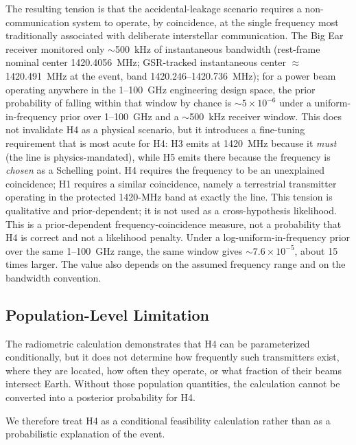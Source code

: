 \documentclass[twocolumn]{aastex701}
\begin{document}
The resulting tension is that the accidental-leakage scenario requires a non-communication system to operate, by coincidence, at the single frequency most traditionally associated with deliberate interstellar communication. The Big Ear receiver monitored only $\sim$500~kHz of instantaneous bandwidth (rest-frame nominal center 1420.4056~MHz; GSR-tracked instantaneous center $\approx$1420.491~MHz at the event, band 1420.246--1420.736~MHz); for a power beam operating anywhere in the 1--100~GHz engineering design space, the prior probability of falling within that window by chance is $\sim5\times10^{-6}$ under a uniform-in-frequency prior over 1--100~GHz and a $\sim$500~kHz receiver window. This does not invalidate H4 as a physical scenario, but it introduces a fine-tuning requirement that is most acute for H4: H3 emits at 1420~MHz because it \emph{must} (the line is physics-mandated), while H5 emits there because the frequency is \emph{chosen} as a Schelling point. H4 requires the frequency to be an unexplained coincidence; H1 requires a similar coincidence, namely a terrestrial transmitter operating in the protected 1420-MHz band at exactly the  line. This tension is qualitative and prior-dependent; it is not used as a cross-hypothesis likelihood. This is a prior-dependent frequency-coincidence measure, not a probability that H4 is correct and not a likelihood penalty. Under a log-uniform-in-frequency prior over the same 1--100~GHz range, the same window gives $\sim7.6\times10^{-5}$, about 15 times larger. The value also depends on the assumed frequency range and on the bandwidth convention.

\subsection{Population-Level Limitation}

The radiometric calculation demonstrates that H4 can be parameterized conditionally, but it does not determine how frequently such transmitters exist, where they are located, how often they operate, or what fraction of their beams intersect Earth. Without those population quantities, the calculation cannot be converted into a posterior probability for H4.

We therefore treat H4 as a conditional feasibility calculation rather than as a probabilistic explanation of the event.

\end{document}
